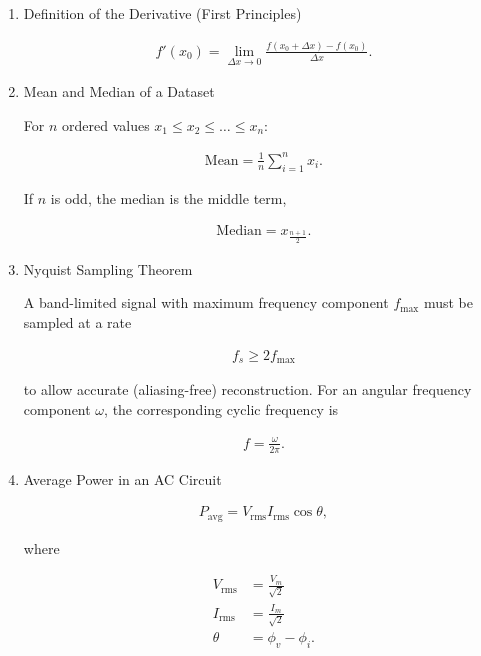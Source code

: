 \begin{enumerate}[label=\thesubsection.\arabic*,ref=\thesubsection.\theenumi]
\item Definition of the Derivative (First Principles)

\begin{align}
f'(x_0)=\lim_{\Delta x\to 0}\frac{f(x_0+\Delta x)-f(x_0)}{\Delta x}. \label{derivative}
\end{align}

\item Mean and Median of a Dataset

For $n$ ordered values $x_1\le x_2\le\dots\le x_n$:

\begin{align}
\text{Mean}=\frac{1}{n}\sum_{i=1}^{n}x_i. \label{mean}
\end{align}

If $n$ is odd, the median is the middle term,

\begin{align}
\text{Median}=x_{\frac{n+1}{2}}. \label{median}
\end{align}

\item Nyquist Sampling Theorem \label{sampling}

A band-limited signal with maximum frequency component $f_{\max}$
must be sampled at a rate

\begin{align}
f_s\ge 2f_{\max}
\end{align}

to allow accurate (aliasing-free) reconstruction. For an angular
frequency component $\omega$, the corresponding cyclic frequency is

\begin{align}
f=\frac{\omega}{2\pi}.
\end{align}

\item Average Power in an AC Circuit

\begin{align}
P_{\text{avg}}=V_{\text{rms}}I_{\text{rms}}\cos\theta, \label{power}
\end{align}

where

\begin{align}
V_{\text{rms}}&=\frac{V_m}{\sqrt2}\\
I_{\text{rms}}&=\frac{I_m}{\sqrt2}\\
\theta&=\phi_v-\phi_i.
\end{align}


\end{enumerate}
